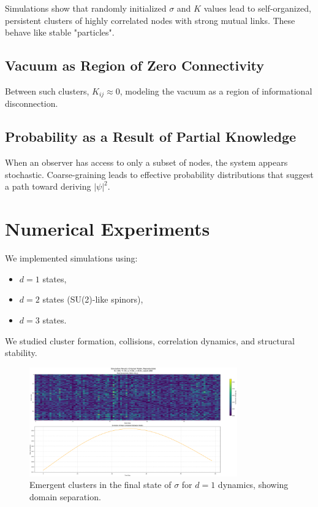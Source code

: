 \documentclass[12pt]{article}
\begin{document}
Simulations show that randomly initialized $\sigma$ and $K$ values lead to self-organized, persistent clusters of highly correlated nodes with strong mutual links. These behave like stable "particles".

\subsection{Vacuum as Region of Zero Connectivity}

Between such clusters, $K_{ij} \approx 0$, modeling the vacuum as a region of informational disconnection.

\subsection{Probability as a Result of Partial Knowledge}

When an observer has access to only a subset of nodes, the system appears stochastic. Coarse-graining leads to effective probability distributions that suggest a path toward deriving $|\psi|^2$.

\section{Numerical Experiments}

We implemented simulations using:
\begin{itemize}
    \item $d=1$ states,
    \item $d=2$ states (SU(2)-like spinors),
    \item $d=3$ states.
\end{itemize}

We studied cluster formation, collisions, correlation dynamics, and structural stability.

\begin{figure}[htbp]
\centering
\includegraphics[width=0.8\textwidth]{figures/d1_sigma_matrix.png}
\caption{Emergent clusters in the final state of \texorpdfstring{$\sigma$}{sigma} for $d=1$ dynamics, showing domain separation.}
\end{figure}
\end{document}
